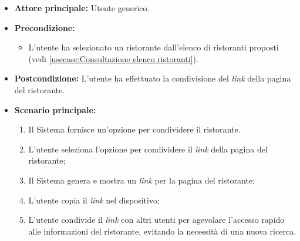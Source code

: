 \label{usecase:Condivisione link del ristorante}
\begin{itemize}
    \item \textbf{Attore principale:} Utente generico.


	\item \textbf{Precondizione:}
	\begin{itemize}
		\item L'utente ha selezionato un ristorante dall'elenco di ristoranti proposti (vedi \autoref{usecase:Consultazione elenco ristoranti}).
	\end{itemize}

	\item \textbf{Postcondizione:}
	      L'utente ha effettuato la condivisione del \textit{link} della pagina del ristorante.

	\item \textbf{Scenario principale:}
	      \begin{enumerate}
			  \item Il Sistema fornisce un'opzione per condividere il ristorante.
			  \item L'utente seleziona l'opzione per condividere il \textit{link} della pagina del ristorante;
		      \item Il Sistema genera e mostra un \textit{link} per la pagina del ristorante;
		      \item L'utente copia il \textit{link} nel dispositivo;
			  \item L'utente condivide il \textit{link} con altri utenti per agevolare l'accesso rapido alle 
			  		informazioni del ristorante, evitando la necessità di una nuova ricerca.
	      \end{enumerate}
\end{itemize}
